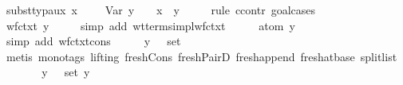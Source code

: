 \begin{isabellebody}
\ subst{\isacharunderscore}typ{\isacharunderscore}aux{\isacharcolon}\ {\isachardoublequoteopen}{\isacharparenleft}x{\isacharcomma}\ {\isasymtau}{\isacharparenright}\ {\isacharhash}\ {\isasymGamma}\ {\isasymturnstile}\ Var\ y\ {\isacharcolon}\ {\isasymsigma}\ {\isasymLongrightarrow}\ x\ {\isacharequal}\ y\ {\isasymLongrightarrow}\ {\isasymtau}\ {\isacharequal}\ {\isasymsigma}{\isachardoublequoteclose}\isanewline
%
\isadelimproof
%
\endisadelimproof
%
\isatagproof
{}\isamarkupfalse%
\ {\isacharparenleft}rule\ ccontr{\isacharcomma}\ goal{\isacharunderscore}cases{\isacharparenright}\isanewline
{}\isamarkupfalse%
\ {}\ \isanewline
\ \ \isamarkupfalse%
\ \isamarkupfalse%
\ {\isachardoublequoteopen}wf{\isacharunderscore}ctxt\ {\isacharparenleft}{\isacharparenleft}y{\isacharcomma}\ {\isasymtau}{\isacharparenright}\ {\isacharhash}\ {\isasymGamma}{\isacharparenright}{\isachardoublequoteclose}\ \isamarkupfalse%
\ {\isacharparenleft}simp\ add{\isacharcolon}\ wt{\isacharunderscore}terms{\isacharunderscore}impl{\isacharunderscore}wf{\isacharunderscore}ctxt{\isacharparenright}\isanewline
\ \ \isamarkupfalse%
\ \isamarkupfalse%
\ {\isachardoublequoteopen}atom\ y\ {\isasymsharp}\ {\isasymGamma}{\isachardoublequoteclose}\ \isamarkupfalse%
\ {\isacharparenleft}simp\ add{\isacharcolon}\ wf{\isacharunderscore}ctxt{\isacharunderscore}cons{\isacharparenright}\isanewline
\ \ \isamarkupfalse%
\ \isamarkupfalse%
\ {\isachardoublequoteopen}{\isacharparenleft}y{\isacharcomma}\ {\isasymsigma}{\isacharparenright}\ {\isasymnotin}\ set\ {\isasymGamma}{\isachardoublequoteclose}\ \isamarkupfalse%
\ {\isacharparenleft}metis\ {\isacharparenleft}mono{\isacharunderscore}tags{\isacharcomma}\ lifting{\isacharparenright}\ fresh{\isacharunderscore}Cons\ fresh{\isacharunderscore}PairD{\isacharparenleft}{}{\isacharparenright}\ fresh{\isacharunderscore}append\ fresh{\isacharunderscore}at{\isacharunderscore}base{\isacharparenleft}{}{\isacharparenright}\ split{\isacharunderscore}list{\isacharparenright}\isanewline
\ \ \isamarkupfalse%
\ {}{\isacharparenleft}{}{\isacharparenright}\ \isamarkupfalse%
\ {}{\isacharcolon}\ {\isachardoublequoteopen}{\isacharparenleft}y{\isacharcomma}\ {\isasymsigma}{\isacharparenright}\ {\isasymnotin}\ set\ {\isacharparenleft}{\isacharparenleft}y{\isacharcomma}\ {\isasymtau}{\isacharparenright}\ {\isacharhash}\ {\isasymGamma}{\isacharparenright}{\isachardoublequoteclose}\ \isamarkupfalse%

\end{isabellebody}
